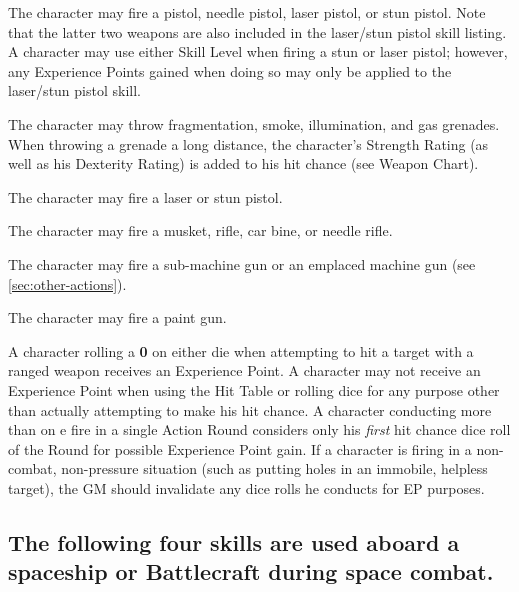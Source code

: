 \label{sec:skill-handguns}

The character may fire a pistol, needle pistol, laser pistol, or stun
pistol.  Note that the latter two weapons are also included in the
laser/stun pistol skill listing.  A character may use either Skill
Level when firing a stun or laser pistol; however, any Experience
Points gained when doing so may only be applied to the laser/stun
pistol skill.

\label{sec:skill-grenades}

The character may throw fragmentation, smoke, illumination, and gas
grenades.  When throwing a grenade a long distance, the character's
Strength Rating (as well as his Dexterity Rating) is added to his hit
chance (see Weapon Chart).

\label{sec:skill-laser-stun-pistol}

The character may fire a laser or stun pistol.  

\label{sec:skill-longarms}

The character may fire a musket, rifle, car bine, or needle rifle.

\label{sec:skill-machine-guns}

The character may fire a sub-machine gun or an emplaced machine gun
(see \ref{sec:other-actions}).

\label{sec:skill-paint-gun}

The character may fire a paint gun.

\bigskip

A character rolling a \textbf{0} on either die when attempting to hit
a target with a ranged weapon receives an Experience Point.  A
character may not receive an Experience Point when using the Hit Table
or rolling dice for any purpose other than actually attempting to make
his hit chance.  A character conducting more than on e fire in a single
Action Round considers only his \emph{first} hit chance dice roll of
the Round for possible Experience Point gain.  If a character is firing
in a non-combat, non-pressure situation (such as putting holes in an
immobile, helpless target), the GM should invalidate any dice rolls he
conducts for EP purposes.


\subsection[Spacecraft Skills]{The following four skills are used
  aboard a spaceship or Battlecraft during space combat.}
\label{sec:foll-four-skills}

